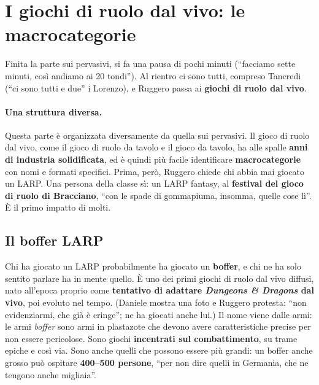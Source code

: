 \section{I giochi di ruolo dal vivo: le macrocategorie}
\label{a2:sec:larp}



Finita la parte sui pervasivi, si fa una pausa di pochi minuti (``facciamo
sette minuti, così andiamo ai 20 tondi''). Al rientro ci sono tutti, compreso
Tancredi (``ci sono tutti e due'' i Lorenzo), e Ruggero passa ai
\textbf{giochi di ruolo dal vivo}.

\paragraph{Una struttura diversa.} Questa parte è organizzata diversamente da
quella sui pervasivi. Il gioco di ruolo dal vivo, come il gioco di ruolo da
tavolo e il gioco da tavolo, ha alle spalle \textbf{anni di industria
solidificata}, ed è quindi più facile identificare \textbf{macrocategorie} con
nomi e formati specifici. Prima, però, Ruggero chiede chi abbia mai giocato un
LARP. Una persona della classe sì: un LARP fantasy, al \textbf{festival del gioco
di ruolo di Bracciano}, ``con le spade di gommapiuma, insomma, quelle cose lì''.
È il primo impatto di molti.

\subsection{Il boffer LARP}

Chi ha giocato un LARP probabilmente ha giocato un \textbf{boffer}, e chi ne ha
solo sentito parlare ha in mente quello. È uno dei primi giochi di ruolo dal
vivo diffusi, nato all'epoca proprio come \textbf{tentativo di adattare
\emph{Dungeons \& Dragons} dal vivo}, poi evoluto nel tempo. (Daniele mostra
una foto e Ruggero protesta: ``non evidenziarmi, che già è cringe''; ne ha
giocati anche lui.) Il nome viene dalle armi: le armi \emph{boffer} sono armi in
plastazote che devono avere caratteristiche precise per non essere pericolose.
Sono giochi \textbf{incentrati sul combattimento}, su trame epiche e così via.
Sono anche quelli che possono essere più grandi: un boffer anche grosso può
ospitare \textbf{400--500 persone}, ``per non dire quelli in Germania, che ne
tengono anche migliaia''.

